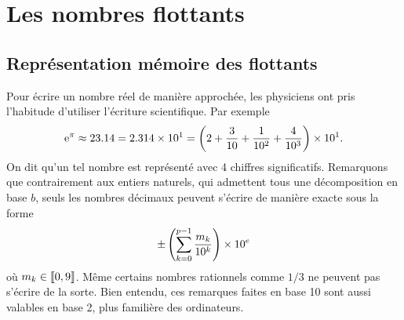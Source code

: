\documentclass{magnoliaold}
\begin{document}








\section{Les nombres flottants}



\subsection{Représentation mémoire des flottants}

Pour écrire un nombre réel de manière approchée, les physiciens ont pris l'habitude
d'utiliser l'écriture scientifique. Par exemple
\[{\rm e}^{\pi}\approx 23.14 = 2.314 \times 10^1 =\left(2+\frac{3}{10}+\frac{1}{10^2}+\frac{4}{10^3}\right)\times 10^1.\]
On dit qu'un tel nombre est représenté avec 4 chiffres significatifs. Remarquons que
contrairement aux entiers naturels, qui admettent tous une décomposition en base $b$,
seuls les nombres décimaux peuvent s'écrire de manière exacte sous la forme
\[\pm\left(\sum_{k=0}^{p-1} \frac{m_k}{10^k}\right)\times 10^e\]
où $m_k\in\left\llbracket 0,9\right\rrbracket$. Même certains nombres rationnels comme $1/3$ ne peuvent
pas s'écrire de la sorte. Bien entendu, ces remarques faites en base 10 sont aussi
valables en base 2, plus familière des ordinateurs.
\end{document}
